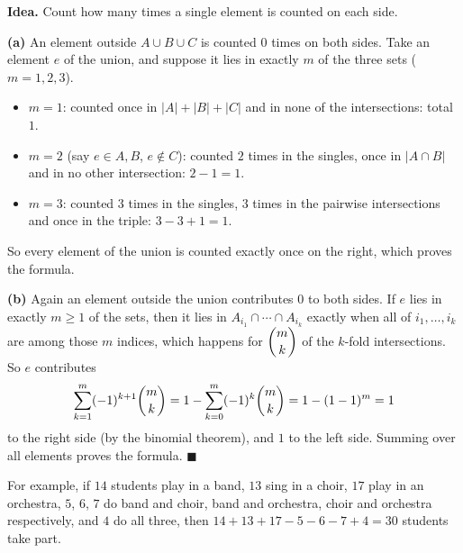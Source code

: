 \textbf{Idea.} Count how many times a single element is counted on each side.

\textbf{(a)} An element outside $A\cup B\cup C$ is counted $0$ times on both sides. Take an element $e$ of the union, and suppose it lies in exactly $m$ of the three sets ($m=1,2,3$).
\begin{itemize}
\item $m=1$: counted once in $|A|+|B|+|C|$ and in none of the intersections: total $1$.
\item $m=2$ (say $e\in A,B$, $e\notin C$): counted $2$ times in the singles, once in $|A\cap B|$ and in no other intersection: $2-1=1$.
\item $m=3$: counted $3$ times in the singles, $3$ times in the pairwise intersections and once in the triple: $3-3+1=1$.
\end{itemize}
So every element of the union is counted exactly once on the right, which proves the formula.

\textbf{(b)} Again an element outside the union contributes $0$ to both sides. If $e$ lies in exactly $m\ge1$ of the sets, then it lies in $A_{i_1}\cap\cdots\cap A_{i_k}$ exactly when all of $i_1,\dots,i_k$ are among those $m$ indices, which happens for $\dbinom mk$ of the $k$-fold intersections. So $e$ contributes
\[
\sum_{k=1}^{m}(-1)^{k+1}\dbinom mk=1-\sum_{k=0}^{m}(-1)^{k}\dbinom mk=1-(1-1)^m=1
\]
to the right side (by the binomial theorem), and $1$ to the left side. Summing over all elements proves the formula. $\blacksquare$

For example, if $14$ students play in a band, $13$ sing in a choir, $17$ play in an orchestra, $5$, $6$, $7$ do band and choir, band and orchestra, choir and orchestra respectively, and $4$ do all three, then $14+13+17-5-6-7+4=30$ students take part.
